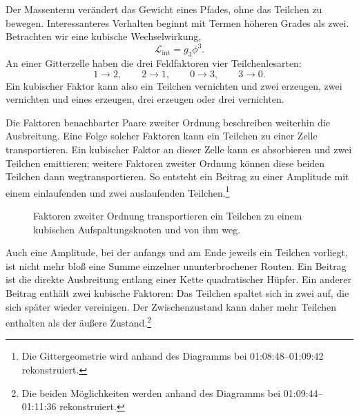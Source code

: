 Der Massenterm verändert das Gewicht eines Pfades, ohne das Teilchen zu bewegen. Interessanteres Verhalten beginnt mit Termen höheren Grades als zwei. Betrachten wir eine kubische Wechselwirkung,
\begin{equation}
\mathcal{L}_{\mathrm{int}}=g_3\phi^3.
\end{equation}
An einer Gitterzelle haben die drei Feldfaktoren vier Teilchenlesarten:
\begin{equation}
1\longrightarrow 2,
\qquad
2\longrightarrow 1,
\qquad
0\longrightarrow 3,
\qquad
3\longrightarrow 0.
\end{equation}
Ein kubischer Faktor kann also ein Teilchen vernichten und zwei erzeugen, zwei vernichten und eines erzeugen, drei erzeugen oder drei vernichten.

Die Faktoren benachbarter Paare zweiter Ordnung beschreiben weiterhin die Ausbreitung. Eine Folge solcher Faktoren kann ein Teilchen zu einer Zelle transportieren. Ein kubischer Faktor an dieser Zelle kann es absorbieren und zwei Teilchen emittieren; weitere Faktoren zweiter Ordnung können diese beiden Teilchen dann wegtransportieren. So entsteht ein Beitrag zu einer Amplitude mit einem einlaufenden und zwei auslaufenden Teilchen.\footnote{Die Gittergeometrie wird anhand des Diagramms bei 01:08:48--01:09:42 rekonstruiert.}

\begin{figure}[htbp]
\centering
{}
\caption{Faktoren zweiter Ordnung transportieren ein Teilchen zu einem kubischen Aufspaltungsknoten und von ihm weg.}
\end{figure}

Auch eine Amplitude, bei der anfangs und am Ende jeweils ein Teilchen vorliegt, ist nicht mehr bloß eine Summe einzelner ununterbrochener Routen. Ein Beitrag ist die direkte Ausbreitung entlang einer Kette quadratischer Hüpfer. Ein anderer Beitrag enthält zwei kubische Faktoren: Das Teilchen spaltet sich in zwei auf, die sich später wieder vereinigen. Der Zwischenzustand kann daher mehr Teilchen enthalten als der äußere Zustand.\footnote{Die beiden Möglichkeiten werden anhand des Diagramms bei 01:09:44--01:11:36 rekonstruiert.}

